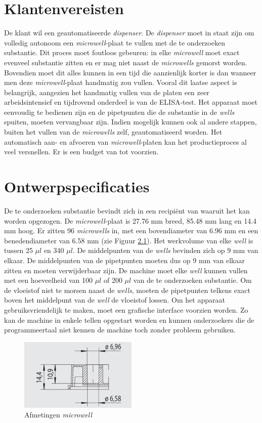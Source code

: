 \documentclass[a4paper,twoside,kulak]{kulakreport} %
\begin{document}
\chapter{Klantenvereisten}
De klant wil een geautomatiseerde \textit{dispenser}. De \textit{dispenser} moet in staat zijn om volledig autonoom een \textit{microwell}-plaat te vullen met de te onderzoeken substantie. Dit proces moet foutloos gebeuren: in elke \textit{microwell} moet exact evenveel substantie zitten en er mag niet naast de \textit{microwells} gemorst worden. Bovendien moet dit alles kunnen in een tijd die aanzienlijk korter is dan wanneer men deze \textit{microwell}-plaat handmatig zou vullen. Vooral dit laatse aspect is belangrijk, aangezien het handmatig vullen van de platen een zeer arbeidsintensief en tijdrovend onderdeel is van de ELISA-test. Het apparaat moet eenvoudig te bedienen zijn en de pipetpunten die de substantie in de \textit{wells} spuiten, moeten vervangbaar zijn.  Indien mogelijk kunnen ook al andere stappen, buiten het vullen van de \textit{microwells} zelf, geautomatiseerd worden. Het automatisch aan- en afvoeren van \textit{microwell}-platen kan het productieproces al veel versnellen. Er is een budget van  tot  voorzien.
\chapter{Ontwerpspecificaties}
De te onderzoeken substantie bevindt zich in een recipiënt van waaruit het kan worden opgezogen. De \textit{microwell}-plaat is 27.76 mm breed, 85.48 mm lang en 14.4 mm hoog. Er zitten 96 \textit{microwells} in, met een bovendiameter van 6.96 mm en een benedendiameter van 6.58 mm (zie Figuur \ref{fig: afmetingenMicrowellplaat}). Het werkvolume van elke \textit{well} is tussen 25 $\mu l$ en 340 $\mu l$. De middelpunten van de \textit{wells} bevinden zich op 9 mm van elkaar. De middelpunten van de pipetpunten moeten dus op 9 mm van elkaar zitten en moeten verwijderbaar zijn. De machine moet elke \textit{well} kunnen vullen met een hoeveelheid van 100 $\mu l$ of 200 $\mu l$ van de te onderzoeken substantie. Om de vloeistof niet te morsen naast de \textit{wells}, moeten de pipetpunten telkens exact boven het middelpunt van de \textit{well} de vloeistof lossen. Om het apparaat gebruiksvriendelijk te maken, moet een grafische interface voorzien worden. Zo kan de machine in enkele tellen opgestart worden en kunnen onderzoekers die de programmeertaal niet kennen de machine toch zonder probleem gebruiken.

\begin{figure}[h]
	\centering
	\includegraphics[width=0.5\textwidth]{AfmetingenMicrowell.png}
	\caption{Afmetingen \textit{microwell}}
	\label{fig: afmetingenMicrowellplaat}
	
\end{figure} 
\end{document}

